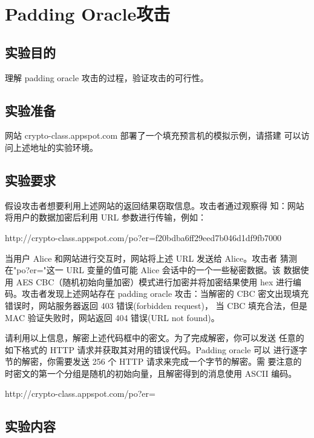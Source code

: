 \chapter{Padding Oracle攻击}

\section{实验目的}

理解 padding oracle 攻击的过程，验证攻击的可行性。

\section{实验准备}

网站 crypto-class.appspot.com 部署了一个填充预言机的模拟示例，请搭建
可以访问上述地址的实验环境。

\section{实验要求}

假设攻击者想要利用上述网站的返回结果窃取信息。攻击者通过观察得
知：网站将用户的数据加密后利用 URL 参数进行传输，例如：

\begin{center}
    http://crypto-class.appspot.com/po?er=f20bdba6ff29eed7b046d1df9fb7000
\end{center}

当用户 Alice 和网站进行交互时，网站将上述 URL 发送给 Alice。攻击者
猜测在"po?er="这一 URL 变量的值可能 Alice 会话中的一个一些秘密数据。该
数据使用 AES CBC（随机初始向量加密）模式进行加密并将加密结果使用
hex 进行编码。攻击者发现上述网站存在 padding oracle 攻击：当解密的
CBC 密文出现填充错误时，网站服务器返回 403 错误(forbidden request)，
当 CBC 填充合法，但是 MAC 验证失败时，网站返回 404 错误(URL not 
found)。

请利用以上信息，解密上述代码框中的密文。为了完成解密，你可以发送
任意的如下格式的 HTTP 请求并获取其对用的错误代码。Padding oracle 可以
进行逐字节的解密，你需要发送 256 个 HTTP 请求来完成一个字节的解密。需
要注意的时密文的第一个分组是随机的初始向量，且解密得到的消息使用
ASCII 编码。

\begin{center}
    http://crypto-class.appspot.com/po?er=
\end{center}

\newpage
\section{实验内容}

